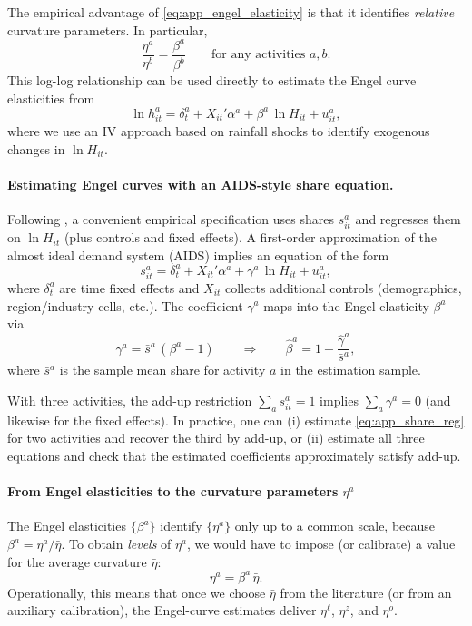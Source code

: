 \documentclass[12pt]{article}
\begin{document}
The empirical advantage of \eqref{eq:app_engel_elasticity} is that it identifies \emph{relative} curvature parameters. In particular,
\begin{equation}
\label{eq:app_eta_ratio}
\frac{\eta^{a}}{\eta^{b}}=\frac{\beta^{a}}{\beta^{b}}
\qquad\text{for any activities }a,b.
\end{equation}
This log-log relationship can be used directly to estimate the Engel curve elasticities from 
$$
\ln h_{it}^{a}
=
\delta_{t}^{a}
+
X_{it}'\alpha^{a}
+
\beta^{a}\,\ln H_{it}
+
u_{it}^{a},
$$
where we use an IV approach based on rainfall shocks to identify exogenous changes in $\ln H_{it}$.

\paragraph{Estimating Engel curves with an AIDS-style share equation.} \label{app:aids_share}
Following \citet{aguiar2021}, a convenient empirical specification uses shares $s_{it}^{a}$ and regresses them on $\ln H_{it}$ (plus controls and fixed effects). A first-order approximation of the almost ideal demand system (AIDS) implies an equation of the form
\begin{equation}
\label{eq:app_share_reg}
s_{it}^{a}
=
\delta_{t}^{a}
+
X_{it}'\alpha^{a}
+
\gamma^{a}\,\ln H_{it}
+
u_{it}^{a},
\end{equation}
where $\delta_t^{a}$ are time fixed effects and $X_{it}$ collects additional controls (demographics, region/industry cells, etc.). The coefficient $\gamma^{a}$ maps into the Engel elasticity $\beta^{a}$ via
\begin{equation}
\label{eq:app_gamma_to_beta}
\gamma^{a}=\bar{s}^{a}\,(\beta^{a}-1)
\qquad\Longrightarrow\qquad
\widehat{\beta}^{a}=1+\frac{\widehat{\gamma}^{a}}{\bar{s}^{a}},
\end{equation}
where $\bar{s}^{a}$ is the sample mean share for activity $a$ in the estimation sample.

With three activities, the add-up restriction $\sum_{a}s_{it}^{a}=1$ implies $\sum_{a}\gamma^{a}=0$ (and likewise for the fixed effects). In practice, one can (i) estimate \eqref{eq:app_share_reg} for two activities and recover the third by add-up, or (ii) estimate all three equations and check that the estimated coefficients approximately satisfy add-up.

\paragraph{From Engel elasticities to the curvature parameters $\eta^{a}$} \label{app:beta_to_eta}
The Engel elasticities $\{\beta^{a}\}$ identify $\{\eta^{a}\}$ only up to a common scale, because $\beta^{a}=\eta^{a}/\bar{\eta}$. To obtain \emph{levels} of $\eta^{a}$, we would have to impose (or calibrate) a value for the average curvature $\bar{\eta}$:
\begin{equation}
\label{eq:app_calibration_eta}
\eta^{a}=\beta^{a}\,\bar{\eta}.
\end{equation}
Operationally, this means that once we choose $\bar{\eta}$ from the literature (or from an auxiliary calibration), the Engel-curve estimates deliver $\eta^{\ell}$, $\eta^{z}$, and $\eta^{o}$.
\end{document}
